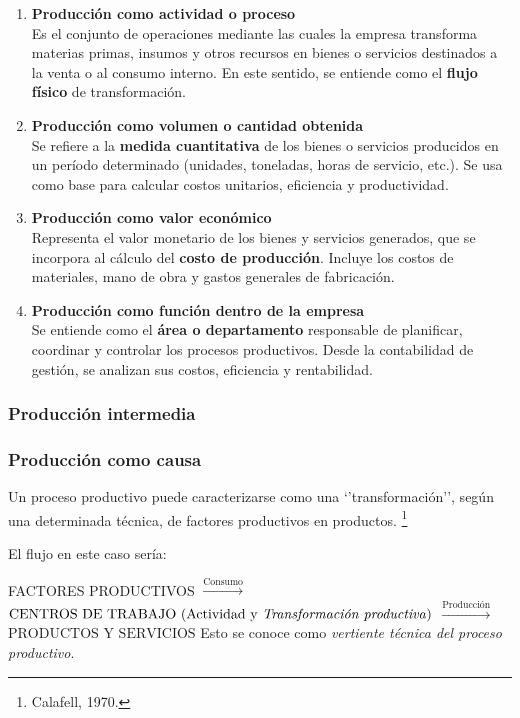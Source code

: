 \documentclass[12pt]{book} %
\begin{document}
\begin{enumerate}
\def\labelenumi{\arabic{enumi}.}
\item
  \textbf{Producción como actividad o proceso}\\
  Es el conjunto de operaciones mediante las cuales la empresa
  transforma materias primas, insumos y otros recursos en bienes o
  servicios destinados a la venta o al consumo interno. En este sentido,
  se entiende como el \textbf{flujo físico} de transformación.
\item
  \textbf{Producción como volumen o cantidad obtenida}\\
  Se refiere a la \textbf{medida cuantitativa} de los bienes o servicios
  producidos en un período determinado (unidades, toneladas, horas de
  servicio, etc.). Se usa como base para calcular costos unitarios,
  eficiencia y productividad.
\item
  \textbf{Producción como valor económico}\\
  Representa el valor monetario de los bienes y servicios generados, que
  se incorpora al cálculo del \textbf{costo de producción}. Incluye los
  costos de materiales, mano de obra y gastos generales de fabricación.
\item
  \textbf{Producción como función dentro de la empresa}\\
  Se entiende como el \textbf{área o departamento} responsable de
  planificar, coordinar y controlar los procesos productivos. Desde la
  contabilidad de gestión, se analizan sus costos, eficiencia y
  rentabilidad.
\end{enumerate}

\subsubsection*{Producción intermedia}


\subsubsection*{Producción como causa}

Un proceso productivo puede caracterizarse como una `'transformación'',
según una determinada técnica, de factores productivos en productos.
\footnote{Calafell, 1970.}

El flujo en este caso sería:

FACTORES PRODUCTIVOS \(\xrightarrow{\text{Consumo}}\)
\(\text{CENTROS DE TRABAJO (Actividad y \textit{Transformación productiva})}\)
\(\xrightarrow{\text{Producción}}\) \(\text{PRODUCTOS Y SERVICIOS}\)
Esto se conoce como \emph{vertiente técnica del proceso productivo}.
\end{document}
